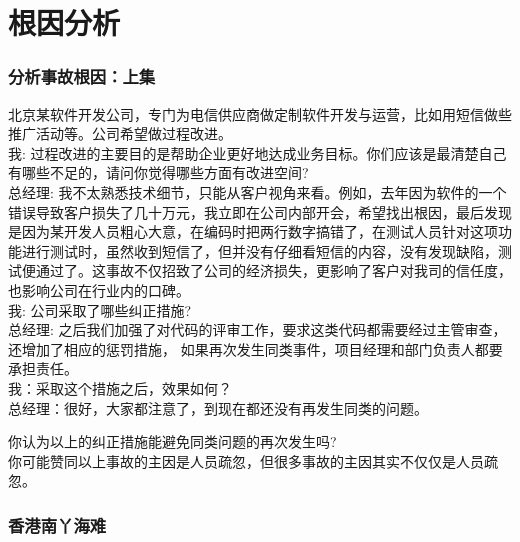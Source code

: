 
\chapter{根因分析} %

\hypertarget{ux5206ux6790ux4e8bux6545ux6839ux56e0ux4e0aux96c6}{%
\subsection{分析事故根因：上集}\label{ux5206ux6790ux4e8bux6545ux6839ux56e0ux4e0aux96c6}}

北京某软件开发公司，专门为电信供应商做定制软件开发与运营，比如用短信做些推广活动等。公司希望做过程改进。\\
我:
过程改进的主要目的是帮助企业更好地达成业务目标。你们应该是最清楚自己有哪些不足的，请问你觉得哪些方面有改进空间?\\
总经理: 我不太熟悉技术细节，只能从客户视角来看。例如，去年因为软件的一个错误导致客户损失了几十万元，我立即在公司内部开会，希望找出根因，最后发现是因为某开发人员粗心大意，在编码时把两行数字搞错了，在测试人员针对这项功能进行测试时，虽然收到短信了，但并没有仔细看短信的内容，没有发现缺陷，测试便通过了。这事故不仅招致了公司的经济损失，更影响了客户对我司的信任度，也影响公司在行业内的口碑。\\
我: 公司采取了哪些纠正措施?\\
总经理: 之后我们加强了对代码的评审工作，要求这类代码都需要经过主管审查，还增加了相应的惩罚措施， 如果再次发生同类事件，项目经理和部门负责人都要承担责任。\\
我：采取这个措施之后，效果如何？\\
总经理：很好，大家都注意了，到现在都还没有再发生同类的问题。

\begin{description}
\item[]
\begin{description}
\tightlist
\item[]
= = =
\end{description}
\end{description}

你认为以上的纠正措施能避免同类问题的再次发生吗?\\
你可能赞同以上事故的主因是人员疏忽，但很多事故的主因其实不仅仅是人员疏忽。

\hypertarget{ux9999ux6e2fux5357ux4e2bux6d77ux96be}{%
\subsection{香港南丫海难}\label{ux9999ux6e2fux5357ux4e2bux6d77ux96be}}

